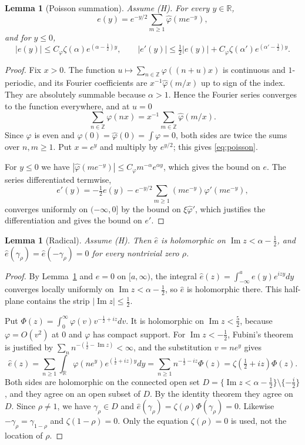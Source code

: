 \documentclass[11pt]{amsart}
\newtheorem{lemma}[proposition]{Lemma}
\theoremstyle{definition}
\theoremstyle{remark}
\numberwithin{equation}{section}
\newcommand{\R}{\mathbb{R}}
\begin{document}
\begin{lemma}[Poisson summation]\label{lem:poisson}
Assume (H). For every $y\in\R$,
\begin{equation}\label{eq:poisson}
e(y)=e^{-y/2}\sum_{m\ge1}\hat\varphi(me^{-y}),
\end{equation}
and for $y\le0$,
\[
|e(y)|\le C_\varphi\zeta(\alpha)e^{(\alpha-\frac12)y},\qquad |e'(y)|\le\tfrac12|e(y)|+C_\varphi\zeta(\alpha')e^{(\alpha'-\frac12)y}.
\]
\end{lemma}
\begin{proof}
Fix $x>0$. The function $u\mapsto\sum_{n\in\mathbb Z}\varphi((n+u)x)$ is continuous and $1$-periodic, and its Fourier coefficients are $x^{-1}\hat\varphi(m/x)$ up to sign of the index. They are absolutely summable because $\alpha>1$. Hence the Fourier series converges to the function everywhere, and at $u=0$
\[
\sum_{n\in\mathbb Z}\varphi(nx)=x^{-1}\sum_{m\in\mathbb Z}\hat\varphi(m/x).
\]
Since $\varphi$ is even and $\varphi(0)=\hat\varphi(0)=\int\varphi=0$, both sides are twice the sums over $n,m\ge1$. Put $x=e^y$ and multiply by $e^{y/2}$; this gives \eqref{eq:poisson}.

For $y\le0$ we have $|\hat\varphi(me^{-y})|\le C_\varphi m^{-\alpha}e^{\alpha y}$, which gives the bound on $e$. The series differentiated termwise,
\[
e'(y)=-\tfrac12e(y)-e^{-y/2}\sum_{m\ge1}(me^{-y})\hat\varphi'(me^{-y}),
\]
converges uniformly on $(-\infty,0]$ by the bound on $\xi\hat\varphi'$, which justifies the differentiation and gives the bound on $e'$.
\end{proof}

\begin{lemma}[Radical]\label{lem:radical}
Assume (H). Then $\hat e$ is holomorphic on $\operatorname{Im}z<\alpha-\frac12$, and $\hat e(\gamma_\rho)=\hat e(-\gamma_\rho)=0$ for every nontrivial zero $\rho$.
\end{lemma}
\begin{proof}
By Lemma~\ref{lem:poisson} and $e=0$ on $[a,\infty)$, the integral $\hat e(z)=\int_{-\infty}^ae(y)e^{izy}dy$ converges locally uniformly on $\operatorname{Im}z<\alpha-\frac12$, so $\hat e$ is holomorphic there. This half-plane contains the strip $|\operatorname{Im}z|\le\frac12$.

Put $\Phi(z)=\int_0^\infty\varphi(v)v^{-\frac12+iz}dv$. It is holomorphic on $\operatorname{Im}z<\frac52$, because $\varphi=O(v^2)$ at $0$ and $\varphi$ has compact support. For $\operatorname{Im}z<-\frac12$, Fubini's theorem is justified by $\sum_nn^{-(\frac12-\operatorname{Im}z)}<\infty$, and the substitution $v=ne^y$ gives
\[
\hat e(z)=\sum_{n\ge1}\int_\R\varphi(ne^y)e^{(\frac12+iz)y}dy=\sum_{n\ge1}n^{-\frac12-iz}\Phi(z)=\zeta(\tfrac12+iz)\Phi(z).
\]
Both sides are holomorphic on the connected open set $D=\{\operatorname{Im}z<\alpha-\frac12\}\setminus\{-\frac i2\}$, and they agree on an open subset of $D$. By the identity theorem they agree on $D$. Since $\rho\ne1$, we have $\gamma_\rho\in D$ and $\hat e(\gamma_\rho)=\zeta(\rho)\Phi(\gamma_\rho)=0$. Likewise $-\gamma_\rho=\gamma_{1-\rho}$ and $\zeta(1-\rho)=0$. Only the equation $\zeta(\rho)=0$ is used, not the location of $\rho$.
\end{proof}
\end{document}

